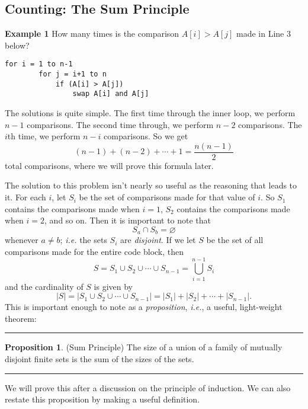 \documentclass[12pt, letterpaper]{article}
\theoremstyle{definition}
\newtheorem{propt}{Proposition}
\newenvironment{prop}[1]{%
    \vspace*{0.2in}
    \linebreak
    \begin{minipage}{\linewidth}
    \rule{\textwidth}{2pt}
        \begin{propt}
}
{%
        \end{propt}
    \rule{\textwidth}{2pt}
    \end{minipage}
    \vspace*{0.2in}
    \linebreak
}
\begin{document}
\subsection*{Counting: The Sum Principle}
\noindent
\textbf{Example 1}
How many times is the comparison $A[i] > A[j]$ made in Line 3 below?

\begin{center}
    \begin{lstlisting}[label=ex1b, caption={Example 1}]
    for i = 1 to n-1
        for j = i+1 to n
            if (A[i] > A[j])
                swap A[i] and A[j]
    \end{lstlisting}
\end{center}


\noindent
The solutions is quite simple. The first time through the inner loop, we perform
$n-1$ comparisons. The second time through, we perform $n-2$ comparisons. The
$i$th time, we perform $n-i$ comparisons. So we get
\begin{equation*}
    (n-1) + (n-2) + \cdots + 1 = \frac{n(n-1)}{2}
\end{equation*}
total comparisons, where we will prove this formula later.

The solution to this problem isn't nearly so useful as the reasoning that leads
to it. For each $i$, let $S_{i}$ be the set of comparisons made for that value
of $i$. So $S_{1}$ contains the comparisons made when $i=1$, $S_{2}$ contains
the comparisons made when $i=2$, and so on. Then it is important to note that
\begin{equation*}
    S_{a} \cap S_{b} = \varnothing
\end{equation*}
whenever $a \neq b$; \emph{i.e.} the sets $S_{i}$ are \emph{disjoint}. If we
let $S$ be the set of all comparisons made for the entire code block, then
\begin{equation*}
    S = S_{1} \cup S_{2} \cup \cdots \cup S_{n-1} = \bigcup_{i=1}^{n-1}S_{i}
\end{equation*}
and the cardinality of $S$ is given by
\begin{equation*}
    |S| = |S_{1} \cup S_{2} \cup \cdots \cup S_{n-1}| = |S_{1}| + |S_{2}| + \cdots + |S_{n-1}|.
\end{equation*}
This is important enough to note as a \emph{proposition}, \emph{i.e.}, a
useful, light-weight theorem:
\begin{prop}
    \textbf{(Sum Principle)}
    The size of a union of a family of mutually disjoint finite sets is the
    sum of the sizes of the sets.
\end{prop}
We will prove this after a discussion on the principle of induction.
We can also restate this proposition by making a useful definition.
\end{document}
